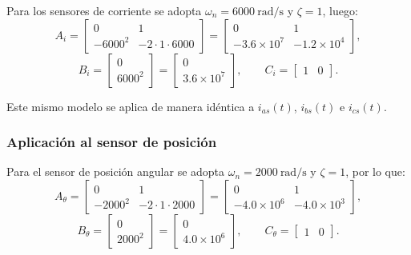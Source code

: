 \documentclass[12pt, a4paper,journal, onecolumn, compsoc]{IEEEtran}
\begin{document}
Para los sensores de corriente se adopta $\omega_n=6000\ \text{rad/s}$ y $\zeta=1$, luego:
\begin{equation}
    A_i=
    \begin{bmatrix}
        0 & 1 \\
        -6000^2 & -2\cdot 1 \cdot 6000
    \end{bmatrix}
    =
    \begin{bmatrix}
        0 & 1 \\
        -3.6\times 10^7 & -1.2\times 10^4
    \end{bmatrix},
\end{equation}
\begin{equation}
    B_i=
    \begin{bmatrix}
        0 \\
        6000^2
    \end{bmatrix}
    =
    \begin{bmatrix}
        0 \\
        3.6\times 10^7
    \end{bmatrix},
    \qquad
    C_i=
    \begin{bmatrix}
        1 & 0
    \end{bmatrix}.
\end{equation}

Este mismo modelo se aplica de manera idéntica a $i_{as}(t)$, $i_{bs}(t)$ e $i_{cs}(t)$.

\subsubsection*{Aplicación al sensor de posición}

Para el sensor de posición angular se adopta $\omega_n=2000\ \text{rad/s}$ y $\zeta=1$, por lo que:
\begin{equation}
    A_\theta=
    \begin{bmatrix}
        0 & 1 \\
        -2000^2 & -2\cdot 1 \cdot 2000
    \end{bmatrix}
    =
    \begin{bmatrix}
        0 & 1 \\
        -4.0\times 10^6 & -4.0\times 10^3
    \end{bmatrix},
\end{equation}
\begin{equation}
    B_\theta=
    \begin{bmatrix}
        0 \\
        2000^2
    \end{bmatrix}
    =
    \begin{bmatrix}
        0 \\
        4.0\times 10^6
    \end{bmatrix},
    \qquad
    C_\theta=
    \begin{bmatrix}
        1 & 0
    \end{bmatrix}.
\end{equation}
\end{document}

